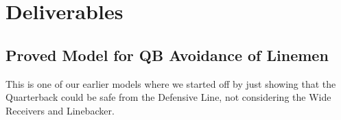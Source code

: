 \newpage %
\section{Deliverables} %

\subsection{Proved Model for QB Avoidance of Linemen}

This is one of our earlier models where we started off by just showing that the Quarterback could be safe from the Defensive Line, not considering the Wide Receivers and Linebacker.

